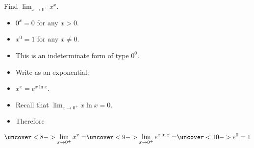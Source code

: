 \begin{frame}
\begin{example}
Find $\lim_{x\rightarrow 0^+} x^x$.
\begin{itemize}
\item<2->  $0^x = 0$ for any $x > 0$.
\item<3->  $x^0 = 1$ for any $x \neq 0$.
\item<4->  This is an indeterminate form of type $0^0$.
\item<5->  Write as an exponential:
\item<6->  $x^x = e^{x\ln x}$.
\item<7->  Recall that $\lim_{x\rightarrow 0^+} x\ln x = 0$.
\item<8->  Therefore
\end{itemize}
\[
\uncover<8->{ \lim_{x\rightarrow 0^+} x^x = }%
\uncover<9->{ \lim_{x\rightarrow 0^+} e^{x\ln x} = }%
\uncover<10->{  e^{0} = 1}%
\]
\end{example}
\end{frame}

